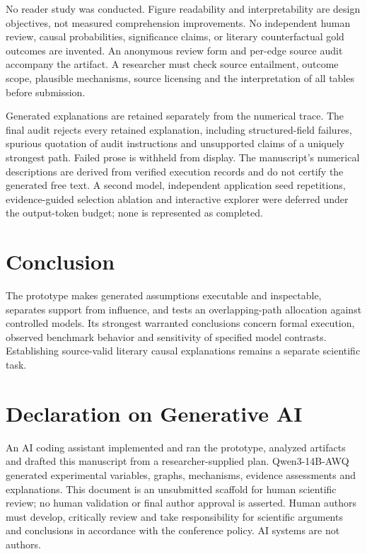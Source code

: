\documentclass{svproc}
\begin{document}
No reader study was conducted. Figure readability and interpretability are design objectives, not measured comprehension improvements. No independent human review, causal probabilities, significance claims, or literary counterfactual gold outcomes are invented. An anonymous review form and per-edge source audit accompany the artifact. A researcher must check source entailment, outcome scope, plausible mechanisms, source licensing and the interpretation of all tables before submission.

Generated explanations are retained separately from the numerical trace. The final audit rejects every retained explanation, including structured-field failures, spurious quotation of audit instructions and unsupported claims of a uniquely strongest path. Failed prose is withheld from display. The manuscript's numerical descriptions are derived from verified execution records and do not certify the generated free text. A second model, independent application seed repetitions, evidence-guided selection ablation and interactive explorer were deferred under the output-token budget; none is represented as completed.

\section{Conclusion}
The prototype makes generated assumptions executable and inspectable, separates support from influence, and tests an overlapping-path allocation against controlled models. Its strongest warranted conclusions concern formal execution, observed benchmark behavior and sensitivity of specified model contrasts. Establishing source-valid literary causal explanations remains a separate scientific task.

\section*{Declaration on Generative AI}
An AI coding assistant implemented and ran the prototype, analyzed artifacts and drafted this manuscript from a researcher-supplied plan. Qwen3-14B-AWQ generated experimental variables, graphs, mechanisms, evidence assessments and explanations. This document is an unsubmitted scaffold for human scientific review; no human validation or final author approval is asserted. Human authors must develop, critically review and take responsibility for scientific arguments and conclusions in accordance with the conference policy. AI systems are not authors.
\end{document}
